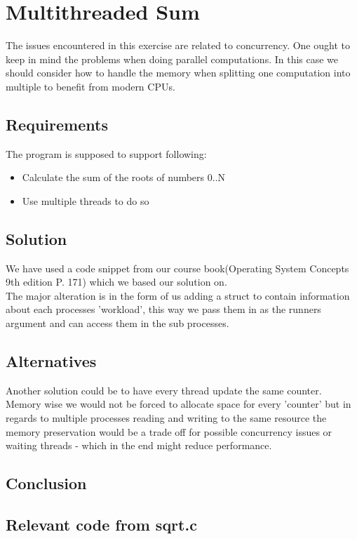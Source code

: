 \chapter{Multithreaded Sum}
The issues encountered in this exercise are related to concurrency. One ought to keep in mind the problems when doing parallel computations. In this case we should consider how to handle the memory when splitting one computation into multiple to benefit from modern CPUs. 

\section{Requirements}
The program is supposed to support following:
\begin{itemize}
\item Calculate the sum of the roots of numbers 0..N
\item Use multiple threads to do so
\end{itemize}

\section{Solution}
We have used a code snippet from our course book(Operating System Concepts 9th edition P. 171) which we based our solution on.\\

The major alteration is in the form of us adding a struct to contain information about each processes 'workload', this way we pass them in as the runners argument and can access them in the sub processes.\\

\section{Alternatives}
Another solution could be to have every thread update the same counter. Memory wise we would not be forced to allocate space for every 'counter' but in regards to multiple processes reading and writing to the same resource the memory preservation would be a trade off for possible concurrency issues or waiting threads - which in the end might reduce performance.

\section{Conclusion}


\section{Relevant code from sqrt.c}
